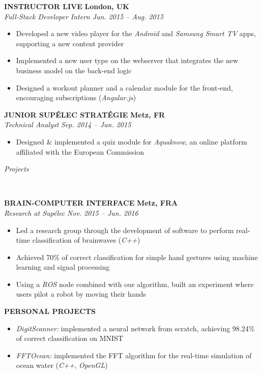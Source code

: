 \documentclass[a4paper, 12pt]{article}
\newcommand{\marginline}{-0.3cm}
\newcommand{\margincontent}{-0.6cm}
\newcommand{\marginbeforesection}{0.25cm}
\newcommand{\linewidthperso}{0.02cm}
\newcommand{\styletitle}[1]{\textbf{#1}}
\newcommand{\styledesc}[1]{\textit{#1}}
\newcommand{\styleloc}[1]{\textbf{#1}}
\newcommand{\styledates}[1]{\textit{#1}}
\newcommand{\stylesection}[1]{
  \vspace{\marginbeforesection}
  \begin{normalsize}\textit{#1}\end{normalsize}
  \vspace{\marginline}\\
  \noindent\makebox[\linewidth]{\rule{\textwidth}{\linewidthperso}}

}
\begin{document}
\begin{footnotesize}
\styletitle{INSTRUCTOR LIVE} \hfill \styleloc{London, UK}\\
\styledesc{Full-Stack Developer Intern} \hfill \styledates{Jun. 2015 -- Aug. 2015}\\
\vspace{\margincontent}
\begin{itemize}
  \item Developed a new video player for the \textit{Android} and \textit{Samsung Smart TV} apps, supporting a new content provider
  \item Implemented a new user type on the webserver that integrates the new business model on the back-end logic
  \item Designed a workout planner and a calendar module for the front-end, encouraging subscriptions (\textit{Angular.js})
\end{itemize}

\styletitle{JUNIOR SUP\'ELEC STRAT\'EGIE} \hfill \styleloc{Metz, FR}\\
\styledesc{Technical Analyst} \hfill \styledates{Sep. 2014 -- Jun. 2015}\\
\vspace{\margincontent}
\begin{itemize}
  \item Designed \& implemented a quiz module for \textit{Aquaknow}, an online platform affiliated with the European Commission
\end{itemize}

\stylesection{Projects}
   
\styletitle{BRAIN-COMPUTER INTERFACE} \hfill \styleloc{Metz, FRA}\\
\styledesc{Research at Sup\'elec} \hfill \styledates{Nov. 2015 -- Jun. 2016}\\
\vspace{\margincontent}
\begin{itemize}
  \item Led a research group through the development of software to perform real-time classification of brainwaves (\textit{C++}) 
  \item Achieved 70\% of correct classification for simple hand gestures using machine learning and signal processing
  \item Using a \textit{ROS} node combined with our algorithm, built an experiment where users pilot a robot by moving their hands 
\end{itemize}

\styletitle{PERSONAL PROJECTS}\\
\vspace{\margincontent}
\begin{itemize}
  \item \textit{DigitScanner:} implemented a neural network from scratch, achieving 98.24\% of correct classification on MNIST
  \item \textit{FFTOcean:} implemented the FFT algorithm for the real-time simulation of ocean water (\textit{C++}, \textit{OpenGL})
\end{itemize}


\end{footnotesize}
\end{document}
